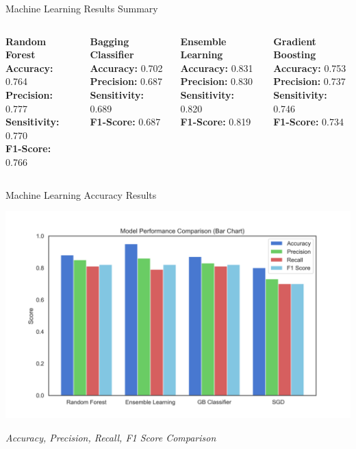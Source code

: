 \begin{frame}{Machine Learning Results Summary}
	\begin{columns}[t]
		\begin{block}{\centering \textbf{Random Forest}}
			\textbf{Accuracy:} 0.764\\
			\textbf{Precision:} 0.777\\
			\textbf{Sensitivity:} 0.770\\
			\textbf{F1-Score:} 0.766
		\end{block}
		
		\vspace{1em}
		
		\begin{block}{\centering \textbf{Bagging Classifier}}
			\textbf{Accuracy:} 0.702\\
			\textbf{Precision:} 0.687\\
			\textbf{Sensitivity:} 0.689\\
			\textbf{F1-Score:} 0.687
		\end{block}
		
		\begin{block}{\centering \textbf{Ensemble Learning}}
			\textbf{Accuracy:} 0.831\\
			\textbf{Precision:} 0.830\\
			\textbf{Sensitivity:} 0.820\\
			\textbf{F1-Score:} 0.819
		\end{block}
		
		\vspace{1em}
		
		\begin{block}{\centering \textbf{Gradient Boosting}}
			\textbf{Accuracy:} 0.753\\
			\textbf{Precision:} 0.737\\
			\textbf{Sensitivity:} 0.746\\
			\textbf{F1-Score:} 0.734
		\end{block}
	\end{columns}
\end{frame}



\begin{frame}{Machine Learning Accuracy Results}
	\begin{center}
		\includegraphics[width=0.7\linewidth]{images/paper_1/bar_chart}
		
		\vspace{0.5em}
		\small\textit{Accuracy, Precision, Recall, F1 Score Comparison}
	\end{center}
\end{frame}

